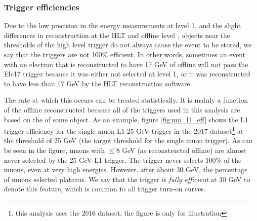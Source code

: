     \subsubsection{Trigger efficiencies} \label{sec:trigger_efficiencies}
    Due to the low precision in the energy measurements at level 1, and the slight differences in reconstruction at the HLT and offline level , objects near the \pt thresholds of the high level trigger do not always cause the event to be stored, we say that the triggers are not 100\% efficient. In other words, sometimes an event with an electron that is reconstructed to have 17 GeV of \pt offline will not pass the Ele17 trigger because it was either not selected at level 1, or it was reconstructed to have less \pt than 17 GeV by the HLT reconstruction software.

    The rate at which this occurs can be treated statistically. It is mainly a function of the offline reconstructed \pt because all of the triggers used in this analysis are based on the \pt of some object. As an example, figure \ref{fig:mu_l1_eff} shows the L1 trigger efficiency for the single muon L1 25 GeV trigger in the 2017 dataset\footnote{this analysis uses the 2016 dataset, the figure is only for illustration} at the \pt threshold of 25 GeV (the target threshold for the single muon trigger). As can be seen in the figure, muons with \pt $\le 8$ GeV (as reconstructed offline) are almost never selected by the 25 GeV L1 trigger. The trigger never selects 100\% of the muons, even at very high energies. However, after about 30 GeV, the percentage of muons selected plateaus. We say that the trigger is \emph{fully efficient} at 30 GeV to denote this feature, which is common to all trigger turn-on curves.

